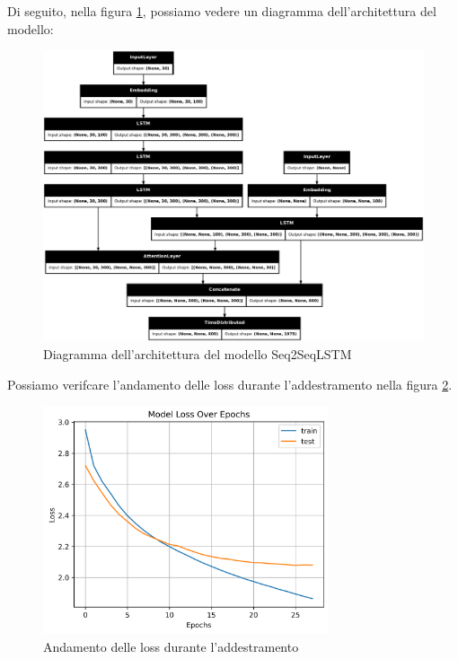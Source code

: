 Di seguito, nella figura \ref{fig:seq2seqlstm_model_architecture}, possiamo vedere un diagramma dell'architettura del modello:

\begin{figure}[H]
    \centering
    \includegraphics[width=1\textwidth]{media/Seq2SeqLSTM_originale_image.png}
    \caption{Diagramma dell'architettura del modello Seq2SeqLSTM}
    \label{fig:seq2seqlstm_model_architecture}
\end{figure}


Possiamo verifcare l'andamento delle loss durante l'addestramento nella figura \ref{fig:seq2seqlstm_loss_plot}.
\begin{figure}[H]
    \centering
    \includegraphics[width=0.75\textwidth]{media/Seq2SeqLSTM_originale_lossplot.png}
    \caption{Andamento delle loss durante l'addestramento}
    \label{fig:seq2seqlstm_loss_plot}
\end{figure}
